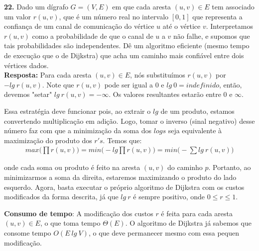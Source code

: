 

\noindent\textbf{22.} Dado um dígrafo $G = (V, E)$ em que cada aresta $(u, v) \in E$ tem associado um valor $r(u, v)$, que é um número real no intervalo $[0, 1]$ que representa a confiança de um canal de comunicação do vértice $u$ até o vértice $v$. Interpretamos $r(u, v)$ como a probabilidade de que o canal de $u$ a $v$ não falhe, e supomos que tais probabilidades são independentes. Dê um algoritmo eficiente (mesmo tempo de execução que o de Dijkstra) que acha um caminho mais confiável entre dois vértices dados.\\[6pt]
\textbf{Resposta:} Para cada aresta $(u, v) \in E$, nós substituímos $r(u, v)$ por $-lg \:{r(u, v)}$. Note que $r(u, v)$ pode ser igual a $0$ e $lg \:0 = indefinido$, então, devemos "setar" $lg \:r(u, v) = -\infty$. Os valores resultantes estarão entre 0 e $\infty$.

Essa estratégia deve funcionar pois, ao extrair o $lg$ de um produto, estamos convertendo multiplicação em adição. Logo, tomar o inverso (sinal negativo) desse número  faz com que a minimização da soma dos $logs$ seja equivalente à maximização do produto dos $r's$. Temos que:
\begin{align*}
max \bigg(\prod r(u, v)\big) = min\bigg(-lg \prod r(u, v)\bigg) = min\bigg(-\sum lg \:r(u, v)\bigg)
\end{align*}

onde cada soma ou produto é feito na aresta $(u, v)$ do caminho $p$. Portanto, ao minimizarmos a soma da direita, estaremos maximizando o produto do lado esquerdo. Agora, basta executar o próprio algoritmo de Dijkstra com os custos modificados da forma descrita, já que $lg \:r$ é sempre positivo, onde $0 \leq r \leq 1$.

\textbf{Consumo de tempo}: A modificação dos custos $r$ é feita para cada aresta $(u, v) \in E$, o que toma tempo $\Theta(E)$. O algoritmo de Dijkstra já sabemos que consome tempo $O(E \:lg \:V)$, o que deve permanecer mesmo com essa pequen modificação.\\[6pt]